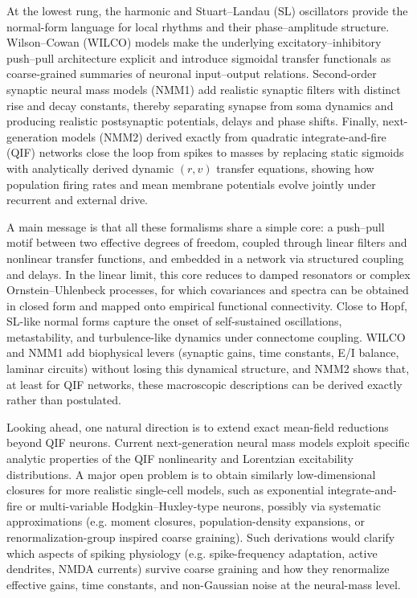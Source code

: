 \documentclass[12pt]{article}
\numberwithin{equation}{section}
\begin{document}
At the lowest rung, the harmonic and Stuart–Landau (SL) oscillators provide the normal-form language for local rhythms and their phase–amplitude structure. Wilson–Cowan (WILCO) models make the underlying excitatory–inhibitory push–pull architecture explicit and introduce sigmoidal transfer functionals as coarse-grained summaries of neuronal input–output relations. Second-order synaptic neural mass models (NMM1) add realistic synaptic filters with distinct rise and decay constants, thereby separating synapse from soma dynamics and producing realistic postsynaptic potentials, delays and phase shifts. Finally, next-generation models (NMM2) derived exactly from quadratic integrate-and-fire (QIF) networks close the loop from spikes to masses by replacing static sigmoids with analytically derived dynamic $(r,v)$ transfer equations, showing how population firing rates and mean membrane potentials evolve jointly under recurrent and external drive.\cite{montbrioMacroscopicDescriptionNetworks2015,coombesNextGenerationNeural2019,byrneNextgenerationNeuralMass2020,clusellaComparisonExactHeuristic2023}

A main message is that all these formalisms share a simple core: a push–pull motif between two effective degrees of freedom, coupled through linear filters and nonlinear transfer functions, and embedded in a network via structured coupling and delays. In the linear limit, this core reduces to damped resonators or complex Ornstein–Uhlenbeck processes, for which covariances and spectra can be obtained in closed form and mapped onto empirical functional connectivity.\cite{ponce-alvarezHopfWholebrainModel2024,Nozari2024} Close to Hopf, SL-like normal forms capture the onset of self-sustained oscillations, metastability, and turbulence-like dynamics under connectome coupling.\cite{decoTurbulentlikeDynamicsHuman2020,cabralMetastableOscillatoryModes2022,Escrichs2022Turbulence} WILCO and NMM1 add biophysical levers (synaptic gains, time constants, E/I balance, laminar circuits) without losing this dynamical structure, and NMM2 shows that, at least for QIF networks, these macroscopic descriptions can be derived exactly rather than postulated.

Looking ahead, one natural direction is to extend exact mean-field reductions beyond QIF neurons. Current next-generation neural mass models exploit specific analytic properties of the QIF nonlinearity and Lorentzian excitability distributions.\cite{montbrioMacroscopicDescriptionNetworks2015,coombesNextGenerationNeural2019} A major open problem is to obtain similarly low-dimensional closures for more realistic single-cell models, such as exponential integrate-and-fire or multi-variable Hodgkin–Huxley-type neurons, possibly via systematic approximations (e.g. moment closures, population-density expansions, or renormalization-group inspired coarse graining).\cite{nykampPopulationDensityApproach2000,buiceSystematicFluctuationExpansion2010,Goldobin2021} Such derivations would clarify which aspects of spiking physiology (e.g. spike-frequency adaptation, active dendrites, NMDA currents) survive coarse graining and how they renormalize effective gains, time constants, and non-Gaussian noise at the neural-mass level.
\end{document}
